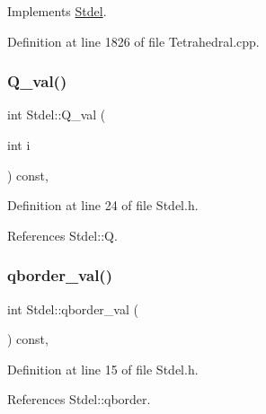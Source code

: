 Implements \hyperlink{classStdel_aec7751f7873772d930c91cf93ec6b07b}{Stdel}.



Definition at line 1826 of file Tetrahedral.\+cpp.

\mbox{\label{classStdel_aeea4659f5bcabbf1acb374180c43a293}} 
\subsubsection{\texorpdfstring{Q\+\_\+val()}{Q\_val()}}
{\footnotesize\ttfamily int Stdel\+::\+Q\+\_\+val (\begin{DoxyParamCaption}\item[{int}]{i }\end{DoxyParamCaption}) const\hspace{0.3cm}{\ttfamily [inline]}, {\ttfamily [inherited]}}



Definition at line 24 of file Stdel.\+h.



References Stdel\+::Q.

\mbox{\label{classStdel_a457d20e34fb7a32eb1e4aca6c19f53a2}} 
\subsubsection{\texorpdfstring{qborder\+\_\+val()}{qborder\_val()}}
{\footnotesize\ttfamily int Stdel\+::qborder\+\_\+val (\begin{DoxyParamCaption}{ }\end{DoxyParamCaption}) const\hspace{0.3cm}{\ttfamily [inline]}, {\ttfamily [inherited]}}



Definition at line 15 of file Stdel.\+h.



References Stdel\+::qborder.




